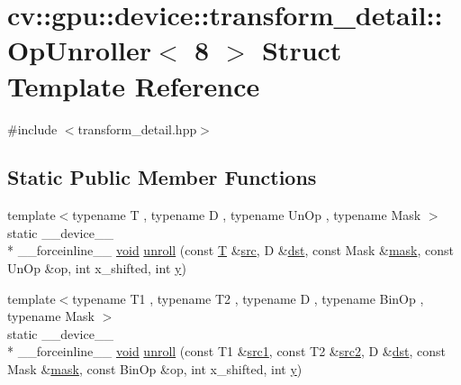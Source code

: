 \hypertarget{structcv_1_1gpu_1_1device_1_1transform__detail_1_1OpUnroller_3_018_01_4}{\section{cv\-:\-:gpu\-:\-:device\-:\-:transform\-\_\-detail\-:\-:Op\-Unroller$<$ 8 $>$ Struct Template Reference}
\label{structcv_1_1gpu_1_1device_1_1transform__detail_1_1OpUnroller_3_018_01_4}
}


{\ttfamily \#include $<$transform\-\_\-detail.\-hpp$>$}

\subsection*{Static Public Member Functions}
\begin{DoxyCompactItemize}
\item 
{\footnotesize template$<$typename T , typename D , typename Un\-Op , typename Mask $>$ }\\static \-\_\-\-\_\-device\-\_\-\-\_\- \\*
\-\_\-\-\_\-forceinline\-\_\-\-\_\- \hyperlink{legacy_8hpp_a8bb47f092d473522721002c86c13b94e}{void} \hyperlink{structcv_1_1gpu_1_1device_1_1transform__detail_1_1OpUnroller_3_018_01_4_a54a72ff35153ccb64e944a323489660b}{unroll} (const \hyperlink{calib3d_8hpp_a3efb9551a871ddd0463079a808916717}{T} \&\hyperlink{legacy_8hpp_a371cd109b74033bc4366f584edd3dacc}{src}, D \&\hyperlink{photo__c_8h_aed13e2a25279b24dc954073233fef7a5}{dst}, const Mask \&\hyperlink{tracking_8hpp_a6b13ecd2fd6ec7ad422f1d7863c3ad19}{mask}, const Un\-Op \&op, int x\-\_\-shifted, int \hyperlink{highgui__c_8h_af1202c02b14870c18fb3a1da73e9e7c7}{y})
\item 
{\footnotesize template$<$typename T1 , typename T2 , typename D , typename Bin\-Op , typename Mask $>$ }\\static \-\_\-\-\_\-device\-\_\-\-\_\- \\*
\-\_\-\-\_\-forceinline\-\_\-\-\_\- \hyperlink{legacy_8hpp_a8bb47f092d473522721002c86c13b94e}{void} \hyperlink{structcv_1_1gpu_1_1device_1_1transform__detail_1_1OpUnroller_3_018_01_4_ad7a2e23d4d7ffe81baeb2bf7ba303668}{unroll} (const T1 \&\hyperlink{core__c_8h_a897de4702c922f4cccda0d57ccdcafb3}{src1}, const T2 \&\hyperlink{core__c_8h_a7561a36d48069d54a6c8ac4e4750edfd}{src2}, D \&\hyperlink{photo__c_8h_aed13e2a25279b24dc954073233fef7a5}{dst}, const Mask \&\hyperlink{tracking_8hpp_a6b13ecd2fd6ec7ad422f1d7863c3ad19}{mask}, const Bin\-Op \&op, int x\-\_\-shifted, int \hyperlink{highgui__c_8h_af1202c02b14870c18fb3a1da73e9e7c7}{y})
\end{DoxyCompactItemize}


